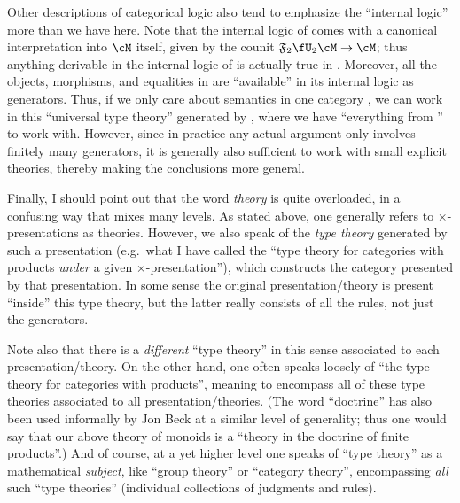 Other descriptions of categorical logic also tend to emphasize the ``internal logic'' more than we have here.
Note that the internal logic of \cM comes with a canonical interpretation into $\cM$ itself, given by the counit $\F2\fU_2\cM \to \cM$; thus anything derivable in the internal logic of \cM is actually true in \cM.
Moreover, all the objects, morphisms, and equalities in \cM are ``available'' in its internal logic as generators.
Thus, if we only care about semantics in one category \cM, we can work in this ``universal type theory'' generated by \cM, where we have ``everything from \cM'' to work with.
However, since in practice any actual argument only involves finitely many generators, it is generally also sufficient to work with small explicit theories, thereby making the conclusions more general.

Finally, I should point out that the word \emph{theory} is quite overloaded, in a confusing way that mixes many levels.
As stated above, one generally refers to $\times$-presentations as theories.
However, we also speak of the \emph{type theory} generated by such a presentation (e.g.\ what I have called the ``type theory for categories with products \emph{under} a given $\times$-presentation''), which constructs the category presented by that presentation.
In some sense the original presentation/theory is present ``inside'' this type theory, but the latter really consists of all the rules, not just the generators.

Note also that there is a \emph{different} ``type theory'' in this sense associated to each presentation/theory.
On the other hand, one often speaks loosely of ``the type theory for categories with products'', meaning to encompass all of these type theories associated to all presentation/theories.
(The word ``doctrine'' has also been used informally by Jon Beck at a similar level of generality; thus one would say that our above theory of monoids is a ``theory in the doctrine of finite products''.)
And of course, at a yet higher level one speaks of ``type theory'' as a mathematical \emph{subject}, like ``group theory'' or ``category theory'', encompassing \emph{all} such ``type theories'' (individual collections of judgments and rules).

